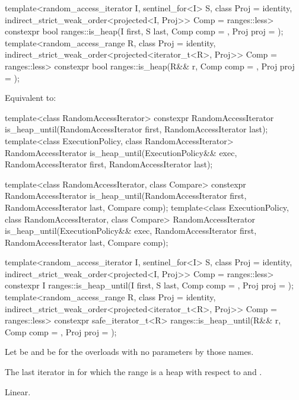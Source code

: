 %
\begin{itemdecl}
template<random_access_iterator I, sentinel_for<I> S, class Proj = identity,
         indirect_strict_weak_order<projected<I, Proj>> Comp = ranges::less>
  constexpr bool ranges::is_heap(I first, S last, Comp comp = {}, Proj proj = {});
template<random_access_range R, class Proj = identity,
         indirect_strict_weak_order<projected<iterator_t<R>, Proj>> Comp = ranges::less>
  constexpr bool ranges::is_heap(R&& r, Comp comp = {}, Proj proj = {});
\end{itemdecl}

\begin{itemdescr}
\pnum
\effects
Equivalent to:
\end{itemdescr}

%
\begin{itemdecl}
template<class RandomAccessIterator>
  constexpr RandomAccessIterator
    is_heap_until(RandomAccessIterator first, RandomAccessIterator last);
template<class ExecutionPolicy, class RandomAccessIterator>
  RandomAccessIterator
    is_heap_until(ExecutionPolicy&& exec,
                  RandomAccessIterator first, RandomAccessIterator last);

template<class RandomAccessIterator, class Compare>
  constexpr RandomAccessIterator
    is_heap_until(RandomAccessIterator first, RandomAccessIterator last,
                  Compare comp);
template<class ExecutionPolicy, class RandomAccessIterator, class Compare>
  RandomAccessIterator
    is_heap_until(ExecutionPolicy&& exec,
                  RandomAccessIterator first, RandomAccessIterator last,
                  Compare comp);

template<random_access_iterator I, sentinel_for<I> S, class Proj = identity,
         indirect_strict_weak_order<projected<I, Proj>> Comp = ranges::less>
  constexpr I ranges::is_heap_until(I first, S last, Comp comp = {}, Proj proj = {});
template<random_access_range R, class Proj = identity,
         indirect_strict_weak_order<projected<iterator_t<R>, Proj>> Comp = ranges::less>
  constexpr safe_iterator_t<R>
    ranges::is_heap_until(R&& r, Comp comp = {}, Proj proj = {});
\end{itemdecl}

\begin{itemdescr}
\pnum
Let  be 
and  be 
for the overloads with no parameters by those names.

\pnum
\returns
The last iterator  in 
for which the range 
is a heap with respect to  and .

\pnum
\complexity
Linear.
\end{itemdescr}


